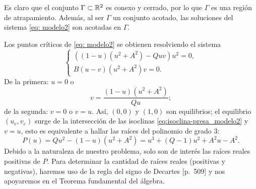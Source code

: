 \begin{remark}
	Es claro que el conjunto $\Gamma \subset {\mathbb{R}}^2$ es conexo y cerrado, por lo que $\Gamma$ es una región de atrapamiento. Además, al ser $\Gamma$ un conjunto acotado, las soluciones del sistema \eqref{eq: modelo2} son acotadas en  $\Gamma$. \\
	\label{re:atrapamiento}
\end{remark}
Los puntos críticos de \eqref{eq: modelo2} se obtienen resolviendo el sistema
\begin{equation}
	\begin{cases}
		((1 - u)(u^{2} + A^{2}) - Q u v)u^{2} = 0,\\
		B(u - v)(u^{2} + A^{2})v = 0.
	\end{cases}
\end{equation}
De la primera: $u=0$ o
\begin{equation}
	v = \dfrac{(1-u)(u^2 + A^2)}{Q u} ;
	\label{eq:isoclina-presa_modelo2}
\end{equation}
de la segunda: $v=0$ o $v=u$. Así, $(0,0)$ y $(1,0)$ son equilibrios; el equilibrio $(u_e, v_e)$ surge de la intersección de las isoclinas \eqref{eq:isoclina-presa_modelo2} y $v = u$, esto es equivalente a hallar las raíces del polinomio de grado 3:
\begin{equation}
	P(u) = Qu^{2} - (1-u)(u^2 + A^2) = u^{3} + (Q-1)u^{2} + A^{2}u - A^{2}.
	\label{eq:polinomioIsoclinasModelo2}
\end{equation}
Debido a la naturaleza de nuestro problema, solo son de interés las raíces reales positivas de $P$. Para determinar la cantidad de raíces reales (positivas y negativas), haremos uso de la regla del signo de Decartes \cite{murray2002}[p.~509] y nos apoyaremos en el Teorema fundamental del álgebra.

